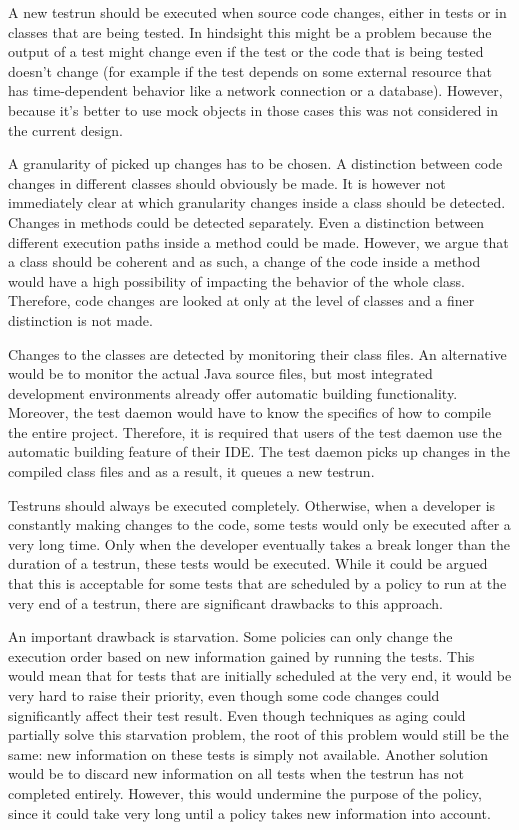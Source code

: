 \documentclass[i2]{oss}
\begin{document}
A new testrun should be executed when source code changes, either in tests or in classes that are being tested. 
In hindsight this might be a problem because the output of a test might
change even if the test or the code that is being tested doesn't change
(for example if the test depends on some external resource that has 
time-dependent behavior like a network connection or a database).
However, because it's better to use mock objects in those cases this was
not considered in the current design.

A granularity of picked up changes has to be chosen.
A distinction between code changes in different classes should obviously be made.
It is however not immediately clear at which granularity changes inside a class should be detected.
Changes in methods could be detected separately.
Even a distinction between different execution paths inside a method could be made.
However, we argue that a class should be coherent and as such, a change of the code inside a method would have a high possibility of impacting the behavior of the whole class.
Therefore, code changes are looked at only at the level of classes and a finer distinction is not made.

Changes to the classes are detected by monitoring their class files.
An alternative would be to monitor the actual Java source files, but most integrated development environments already offer automatic building functionality.
Moreover, the test daemon would have to know the specifics of how to compile the entire project. 
Therefore, it is required that users of the test daemon use the automatic building feature of their IDE.
The test daemon picks up changes in the compiled class files and as a result, it queues a new testrun.

Testruns should always be executed completely.
Otherwise, when a developer is constantly making changes to the code, some tests would only be executed after a very long time.
Only when the developer eventually takes a break longer than the duration of a testrun, these tests would be executed.
While it could be argued that this is acceptable for some tests that are scheduled by a policy to run at the very end of a testrun, there are significant drawbacks to this approach.

An important drawback is starvation. Some policies can only change the execution order based on new information gained by running the tests.
This would mean that for tests that are initially scheduled at the very end, it would be very hard to raise their priority, even though some code changes could significantly affect their test result.
Even though techniques as aging could partially solve this starvation problem, the root of this problem would still be the same: new information on these tests is simply not available. Another solution would be to discard new information on all tests when the testrun has not completed entirely. However, this would undermine the purpose of the policy, since it could take very long until a policy takes new information into account.
\end{document}
